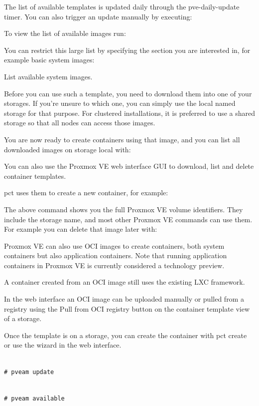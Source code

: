 The list of available templates is updated daily through the pve-daily-update timer. You can also trigger an update manually by executing:

To view the list of available images run:

You can restrict this large list by specifying the section you are interested in, for example basic system images:

List available system images.

Before you can use such a template, you need to download them into one of your storages. If you’re unsure to which one, you can simply use the local named storage for that purpose. For clustered installations, it is preferred to use a shared storage so that all nodes can access those images.

You are now ready to create containers using that image, and you can list all downloaded images on storage local with:

You can also use the Proxmox VE web interface GUI to download, list and delete container templates.

pct uses them to create a new container, for example:

The above command shows you the full Proxmox VE volume identifiers. They include the storage name, and most other Proxmox VE commands can use them. For example you can delete that image later with:

Proxmox VE can also use OCI images to create containers, both system containers but also application containers. Note that running application containers in Proxmox VE is currently considered a technology preview.

A container created from an OCI image still uses the existing LXC framework.

In the web interface an OCI image can be uploaded manually or pulled from a registry using the Pull from OCI registry button on the container template view of a storage.

Once the template is on a storage, you can create the container with pct create or use the wizard in the web interface.

\begin{lstlisting}

# pveam update

\end{lstlisting}

\begin{lstlisting}

# pveam available

\end{lstlisting}


